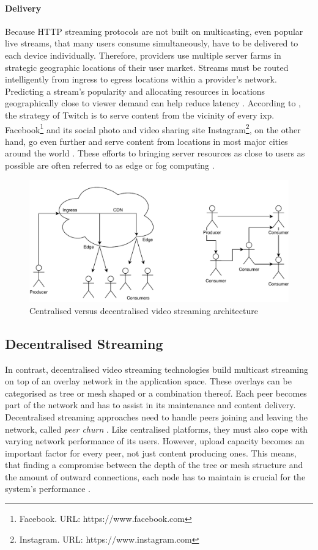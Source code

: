 \paragraph{Delivery}
Because HTTP streaming protocols are not built on multicasting, even popular live streams, that many users consume simultaneously, have to be delivered to each device individually. Therefore, providers use multiple server farms \cite[p. 738-740]{tanenbaum_wetherall_2011} in strategic geographic locations of their user market. Streams must be routed intelligently from ingress to egress locations within a provider's network. Predicting a stream's popularity and allocating resources in locations geographically close to viewer demand can help reduce latency \cite{twitch-case}. According to \citet[\S3]{twitch-case}, the strategy of Twitch is to serve content from the vicinity of every \gls{ixp}. Facebook\footnote{Facebook. URL: {https://www.facebook.com}} and its social photo and video sharing site Instagram\footnote{Instagram. URL: {https://www.instagram.com}}, on the other hand, go even further and serve content from locations in most major cities around the world \cite{facebook-locations}. These efforts to bringing server resources as close to users as possible are often referred to as edge or fog computing \cite{fog-computing, object-store-fog-edge-ipfs}.

\begin{figure}
\centering
\includegraphics[width=.75\textwidth]{graphics/streaming-types.pdf}
\caption{Centralised versus decentralised video streaming architecture}
\label{fig:de-central-architectures}
\end{figure}

\subsection{Decentralised Streaming}

In contrast, decentralised video streaming technologies build multicast streaming on top of an overlay network in the application space. These overlays can be categorised as tree or mesh shaped or a combination thereof. Each peer becomes part of the network and has to assist in its maintenance and content delivery. Decentralised streaming approaches need to handle peers joining and leaving the network, called \textit{peer churn} \cite[\S7.5]{tanenbaum_wetherall_2011}. Like centralised platforms, they must also cope with varying network performance of its users. However, upload capacity becomes an important factor for every peer, not just content producing ones. This means, that finding a compromise between the depth of the tree or mesh structure and the amount of outward connections, each node has to maintain is crucial for the system's performance \cite[\S{III.A}]{multicast-problems}.

